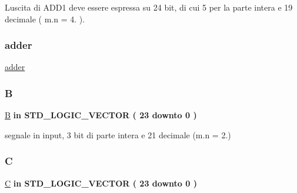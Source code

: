L\textquotesingle{}uscita di A\+D\+D1 deve essere espressa su 24 bit, di cui 5 per la parte intera e 19 decimale ( m.\+n = 4. ). \mbox{\label{group___linear_regression_ga9d7a8a381439c61aea549e7a47ec7a6f}} 
\subsubsection{\texorpdfstring{adder}{adder}}
{\footnotesize\ttfamily \hyperlink{group___linear_regression_ga9d7a8a381439c61aea549e7a47ec7a6f}{adder} {\bfseries \textcolor{vhdlchar}{ }} \hspace{0.3cm}{\ttfamily [Component]}}

\mbox{\label{group___linear_regression_gab6685be06ffd9f2425d01307287a4454}} 
\subsubsection{\texorpdfstring{B}{B}}
{\footnotesize\ttfamily \hyperlink{group___linear_regression_gab6685be06ffd9f2425d01307287a4454}{B} {\bfseries \textcolor{vhdlchar}{in}\textcolor{vhdlchar}{ }} {\bfseries \textcolor{vhdlchar}{S\+T\+D\+\_\+\+L\+O\+G\+I\+C\+\_\+\+V\+E\+C\+T\+OR}\textcolor{vhdlchar}{ }\textcolor{vhdlchar}{(}\textcolor{vhdlchar}{ }\textcolor{vhdlchar}{ } \textcolor{vhdldigit}{23} \textcolor{vhdlchar}{ }\textcolor{vhdlchar}{downto}\textcolor{vhdlchar}{ }\textcolor{vhdlchar}{ } \textcolor{vhdldigit}{0} \textcolor{vhdlchar}{ }\textcolor{vhdlchar}{)}\textcolor{vhdlchar}{ }} \hspace{0.3cm}{\ttfamily [Port]}}



segnale in input, 3 bit di parte intera e 21 decimale (m.\+n = 2.) 

\mbox{\label{group___linear_regression_ga17058a6bcb609074c49be51d09202870}} 
\subsubsection{\texorpdfstring{C}{C}}
{\footnotesize\ttfamily \hyperlink{group___linear_regression_ga17058a6bcb609074c49be51d09202870}{C} {\bfseries \textcolor{vhdlchar}{in}\textcolor{vhdlchar}{ }} {\bfseries \textcolor{vhdlchar}{S\+T\+D\+\_\+\+L\+O\+G\+I\+C\+\_\+\+V\+E\+C\+T\+OR}\textcolor{vhdlchar}{ }\textcolor{vhdlchar}{(}\textcolor{vhdlchar}{ }\textcolor{vhdlchar}{ } \textcolor{vhdldigit}{23} \textcolor{vhdlchar}{ }\textcolor{vhdlchar}{downto}\textcolor{vhdlchar}{ }\textcolor{vhdlchar}{ } \textcolor{vhdldigit}{0} \textcolor{vhdlchar}{ }\textcolor{vhdlchar}{)}\textcolor{vhdlchar}{ }} \hspace{0.3cm}{\ttfamily [Port]}}



